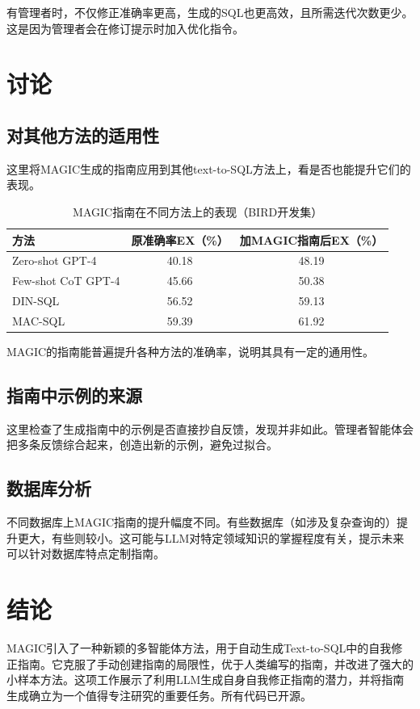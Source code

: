 有管理者时，不仅修正准确率更高，生成的SQL也更高效，且所需迭代次数更少。这是因为管理者会在修订提示时加入优化指令。

\section{讨论}

\subsection{对其他方法的适用性}
这里将MAGIC生成的指南应用到其他text-to-SQL方法上，看是否也能提升它们的表现。

\begin{table}[htbp]
\centering
\caption{MAGIC指南在不同方法上的表现（BIRD开发集）}
\label{tab:applicability}
\begin{tabular}{lcc}
\toprule
方法 & 原准确率EX（\%） & 加MAGIC指南后EX（\%） \\
\midrule
Zero-shot GPT-4 & 40.18 & 48.19 \\
Few-shot CoT GPT-4 & 45.66 & 50.38 \\
DIN-SQL & 56.52 & 59.13 \\
MAC-SQL & 59.39 & 61.92 \\
\bottomrule
\end{tabular}
\end{table}

MAGIC的指南能普遍提升各种方法的准确率，说明其具有一定的通用性。

\subsection{指南中示例的来源}
这里检查了生成指南中的示例是否直接抄自反馈，发现并非如此。管理者智能体会把多条反馈综合起来，创造出新的示例，避免过拟合。

\subsection{数据库分析}
不同数据库上MAGIC指南的提升幅度不同。有些数据库（如涉及复杂查询的）提升更大，有些则较小。这可能与LLM对特定领域知识的掌握程度有关，提示未来可以针对数据库特点定制指南。

\section{结论}

MAGIC引入了一种新颖的多智能体方法，用于自动生成Text-to-SQL中的自我修正指南。它克服了手动创建指南的局限性，优于人类编写的指南，并改进了强大的小样本方法。这项工作展示了利用LLM生成自身自我修正指南的潜力，并将指南生成确立为一个值得专注研究的重要任务。所有代码已开源。
